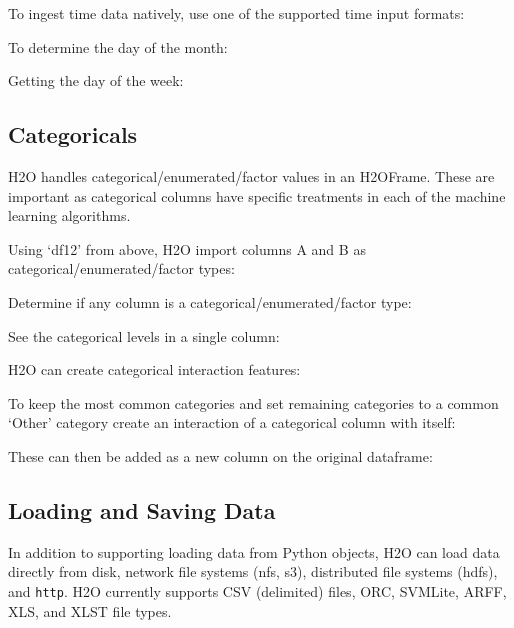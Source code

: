 To ingest time data natively, use one of the supported time input formats:


To determine the day of the month:


Getting the day of the week:


\subsection{Categoricals}
H2O handles categorical/enumerated/factor values in an H2OFrame.  These are important as categorical
columns have specific treatments in each of the machine learning algorithms.

Using `df12' from above, H2O import columns A and B as categorical/enumerated/factor types:


Determine if any column is a categorical/enumerated/factor type:


See the categorical levels in a single column:


H2O can create categorical interaction features:


To keep the most common categories and set remaining categories to a common `Other' category
create an interaction of a categorical column with itself:


These can then be added as a new column on the original dataframe:


\subsection{Loading and Saving Data}
In addition to supporting loading data from Python objects, H2O can load data directly from
disk, network file systems (nfs, s3), distributed file systems (hdfs), and {\texttt{http}}.  H2O currently supports
CSV (delimited) files, ORC, SVMLite, ARFF, XLS, and XLST file types.

